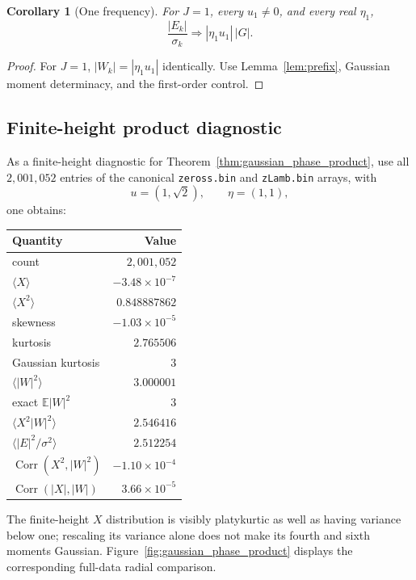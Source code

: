 \documentclass[pdflatex,sn-mathphys-num]{sn-jnl}
\numberwithin{equation}{section}
\theoremstyle{thmstyleone}
\newtheorem{corollary}[theorem]{Corollary}
\theoremstyle{thmstylethree}
\theoremstyle{thmstyletwo}
\newcommand{\E}{\mathbb E}
\newcommand{\Corr}{\operatorname{Corr}}
\newcommand{\1}{\mathbf 1}
\begin{document}
\begin{corollary}[One frequency]
\label{cor:one_frequency}
For $J=1$, every $u_1\ne0$, and every real $\eta_1$,
\[
 \frac{|E_k|}{\sigma_k}\Longrightarrow |\eta_1u_1|\,|G|.
\]
\end{corollary}

\begin{proof}
For $J=1$, $|W_k|=|\eta_1u_1|$ identically.  Use Lemma~\ref{lem:prefix}, Gaussian moment determinacy, and the first-order control.
\end{proof}

\subsection{Finite-height product diagnostic}

As a finite-height diagnostic for Theorem~\ref{thm:gaussian_phase_product}, use all $2{,}001{,}052$ entries of the canonical \texttt{zeross.bin} and
\texttt{zLamb.bin} arrays, with
\[
 u=(1,\sqrt2),\qquad \eta=(1,1),
\]
one obtains:

\begin{center}
\begin{tabular}{@{}lr@{}}
\toprule
Quantity & Value\\
\midrule
count & $2{,}001{,}052$\\
$\langle X\rangle$ & $-3.48\times10^{-7}$\\
$\langle X^2\rangle$ & $0.848887862$\\
skewness & $-1.03\times10^{-5}$\\
kurtosis & $2.765506$\\
Gaussian kurtosis & $3$\\
$\langle |W|^2\rangle$ & $3.000001$\\
exact $\E|W|^2$ & $3$\\
$\langle X^2|W|^2\rangle$ & $2.546416$\\
$\langle |E|^2/\sigma^2\rangle$ & $2.512254$\\
$\Corr(X^2,|W|^2)$ & $-1.10\times10^{-4}$\\
$\Corr(|X|,|W|)$ & $3.66\times10^{-5}$\\
\bottomrule
\end{tabular}
\end{center}


The finite-height $X$ distribution is visibly platykurtic as well as having variance below one; rescaling its variance alone does not make its fourth and sixth moments Gaussian.  Figure~\ref{fig:gaussian_phase_product} displays the corresponding full-data radial comparison.
\end{document}
